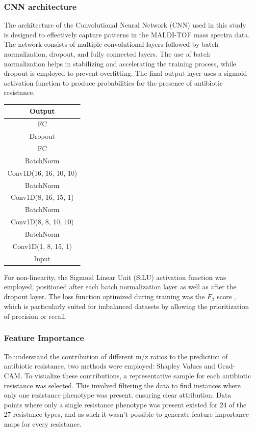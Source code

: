 \documentclass[english,11pt,a4paper,titlepage]{article}
\begin{document}
	\subsubsection*{CNN architecture}
	\begin{multicols}{2}
		\noindent
		The architecture of the Convolutional Neural Network (CNN) used in this study is designed to effectively capture patterns in the MALDI-TOF mass spectra data. The network consists of multiple convolutional layers followed by batch normalization, dropout, and fully connected layers. The use of batch normalization helps in stabilizing and accelerating the training process, while dropout is employed to prevent overfitting. The final output layer uses a sigmoid activation function to produce probabilities for the presence of antibiotic resistance.
		
		\columnbreak
		
		\begin{tabular}{|c|}
			\hline
			Output \\
			\hline
			FC \\
			\hline
			Dropout \\
			\hline
			FC \\
			\hline
			BatchNorm \\
			\hline
			Conv1D(16, 16, 10, 10) \\
			\hline
			BatchNorm \\
			\hline
			Conv1D(8, 16, 15, 1) \\
			\hline
			BatchNorm \\
			\hline
			Conv1D(8, 8, 10, 10) \\
			\hline
			BatchNorm \\
			\hline
			Conv1D(1, 8, 15, 1) \\
			\hline
			Input \\
			\hline
		\end{tabular}
		
	\end{multicols}
	For non-linearity, the Sigmoid Linear Unit (SiLU) activation function was employed, positioned after each batch normalization layer as well as after the dropout layer. The loss function optimized during training was the \( F_{\beta} \) score \cite{leeSurrogateLossFunction2021}, which is particularly suited for imbalanced datasets by allowing the prioritization of precision or recall.
	
	\subsubsection*{Feature Importance}
	To understand the contribution of different m/z ratios to the prediction of antibiotic resistance, two methods were employed: Shapley Values and Grad-CAM. To visualize these contributions, a representative sample for each antibiotic resistance was selected. This involved filtering the data to find instances where only one resistance phenotype was present, ensuring clear attribution. Data points where only a single resistance phenotype was present existed for 24 of the 27 resistance types, and as such it wasn't possible to generate feature importance maps for every resistance.
	
\end{document}

